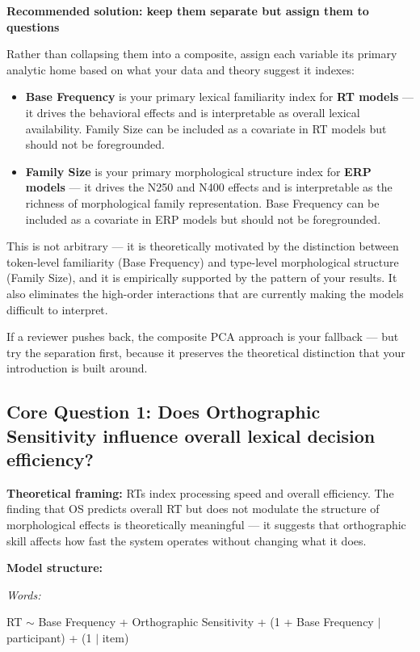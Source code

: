 \documentclass[12pt]{article}
\begin{document}
	\textbf{Recommended solution: keep them separate but assign them to questions}
	
	Rather than collapsing them into a composite, assign each variable its primary analytic home based on what your data and theory suggest it indexes:
	
	\begin{itemize}[leftmargin=*]
		\item \textbf{Base Frequency} is your primary lexical familiarity index for \textbf{RT models} — it drives the behavioral effects and is interpretable as overall lexical availability. Family Size can be included as a covariate in RT models but should not be foregrounded.
		\item \textbf{Family Size} is your primary morphological structure index for \textbf{ERP models} — it drives the N250 and N400 effects and is interpretable as the richness of morphological family representation. Base Frequency can be included as a covariate in ERP models but should not be foregrounded.
	\end{itemize}
	
	This is not arbitrary — it is theoretically motivated by the distinction between token-level familiarity (Base Frequency) and type-level morphological structure (Family Size), and it is empirically supported by the pattern of your results. It also eliminates the high-order interactions that are currently making the models difficult to interpret.
	
	If a reviewer pushes back, the composite PCA approach is your fallback — but try the separation first, because it preserves the theoretical distinction that your introduction is built around.
	
	\subsection{Core Question 1: Does Orthographic Sensitivity influence overall lexical decision efficiency?}
	
	\textbf{Theoretical framing:} RTs index processing speed and overall efficiency. The finding that OS predicts overall RT but does not modulate the structure of morphological effects is theoretically meaningful — it suggests that orthographic skill affects how fast the system operates without changing what it does.
	
	\textbf{Model structure:}
	
	\textit{Words:}
	
	RT $\sim$ Base Frequency + Orthographic Sensitivity + (1 + Base Frequency $|$ participant) + (1 $|$ item)
	
\end{document}
